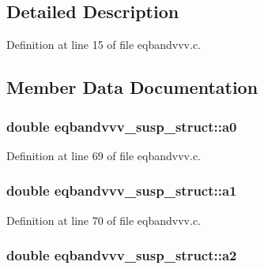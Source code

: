\subsection{Detailed Description}


Definition at line 15 of file eqbandvvv.\+c.



\subsection{Member Data Documentation}
\subsubsection[{\texorpdfstring{a0}{a0}}]{\setlength{\rightskip}{0pt plus 5cm}double eqbandvvv\+\_\+susp\+\_\+struct\+::a0}\hypertarget{structeqbandvvv__susp__struct_a40e26796a2ebc6b4a4f03fbd1a38a8bb}{}\label{structeqbandvvv__susp__struct_a40e26796a2ebc6b4a4f03fbd1a38a8bb}


Definition at line 69 of file eqbandvvv.\+c.

\subsubsection[{\texorpdfstring{a1}{a1}}]{\setlength{\rightskip}{0pt plus 5cm}double eqbandvvv\+\_\+susp\+\_\+struct\+::a1}\hypertarget{structeqbandvvv__susp__struct_a882992ea9403efc116cadee2d9194da0}{}\label{structeqbandvvv__susp__struct_a882992ea9403efc116cadee2d9194da0}


Definition at line 70 of file eqbandvvv.\+c.

\subsubsection[{\texorpdfstring{a2}{a2}}]{\setlength{\rightskip}{0pt plus 5cm}double eqbandvvv\+\_\+susp\+\_\+struct\+::a2}\hypertarget{structeqbandvvv__susp__struct_a84ad71cfc457b95fba25247769956046}{}\label{structeqbandvvv__susp__struct_a84ad71cfc457b95fba25247769956046}


